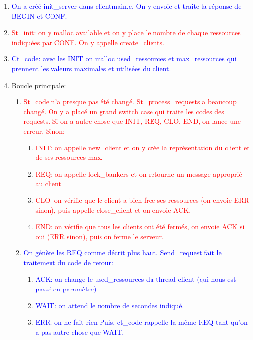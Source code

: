 \documentclass[11pt]{article}
\begin{document}
\begin{enumerate}[label=\alph*.]
 \item \textcolor{blue}{On a créé init\_server dans client\/main.c. On y envoie et traite la réponse de BEGIN et CONF.}
 \item \textcolor{red}{St\_init: on y malloc available et on y place le nombre de chaque ressources indiquées par CONF. On y appelle create\_clients.}
 \item \textcolor{blue}{Ct\_code: avec les INIT on malloc used\_ressources et max\_ressources qui prennent les valeurs maximales et utilisées du client.}
 \item Boucle principale:
  \begin{enumerate}[label =\roman*.]
   \item \textcolor{red}{St\_code n’a presque pas été changé. St\_process\_requests a beaucoup changé. On y a placé un grand switch case qui traite les codes des requests. Si on a autre chose que INIT, REQ, CLO, END, on lance une erreur. Sinon:}
     \begin{enumerate}
      \item \textcolor{red}{INIT: on appelle new\_client et on y crée la représentation du client et de ses ressources max.}
      \item \textcolor{red}{REQ: on appelle lock\_bankers et on retourne un message approprié au client}
      \item \textcolor{red}{CLO: on vérifie que le client a bien free ses ressources (on envoie ERR sinon), puis appelle close\_client et on envoie ACK.}
      \item \textcolor{red}{END: on vérifie que tous les clients ont été fermés, on envoie ACK si oui (ERR sinon), puis on ferme le serveur.}
     \end{enumerate}
   \item \textcolor{blue}{On génère les REQ comme décrit plus haut. Send\_request fait le traitement du code de retour:}
    \begin{enumerate}
     \item \textcolor{blue}{ACK: on change le used\_ressources du thread client (qui nous est passé en paramètre).}
     \item \textcolor{blue}{WAIT: on attend le nombre de secondes indiqué.}
     \item \textcolor{blue}{ERR: on ne fait rien}
     \textcolor{blue}{Puis, ct\_code rappelle la même REQ tant qu’on a pas autre chose que WAIT.}
    \end{enumerate}

\end{enumerate}
\end{enumerate}
\end{document}
